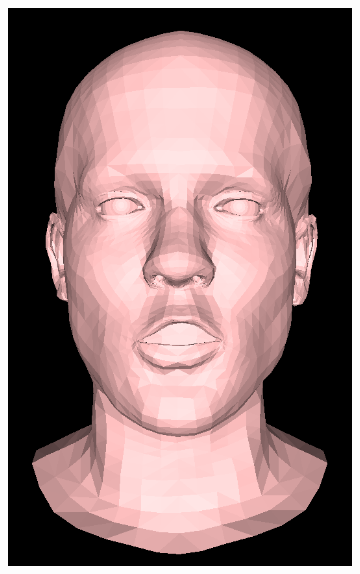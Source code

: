\begin{figure}[h]
\begin{subfigure}[b]{0.24\textwidth}
        \includegraphics[width=\textwidth]{figures/blendshape_interp/2/00002.png}
    \end{subfigure}
    \begin{subfigure}[b]{0.24\textwidth}

\end{subfigure}
\end{figure}

